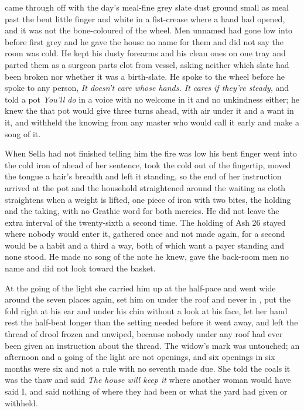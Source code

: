  came through  off  with the day's meal-fine grey slate dust ground small as meal past the bent little finger and white in a fist-crease where a hand had opened, and it was not the bone-coloured  of the wheel. Men unnamed had gone low into  before first grey and he gave the house no name for them and did not say the room was cold. He kept his dusty forearms and his clean ones on one tray and parted them as a surgeon parts clot from vessel, asking neither which slate had been broken nor whether it was a birth-slate. He spoke to the wheel before he spoke to any person, \emph{It doesn't care whose hands. It cares if they're steady}, and told a pot \emph{You'll do} in a voice with no welcome in it and no unkindness either; he knew the  that pot would give three turns ahead, with air under it and a want in it, and withheld the knowing from any  master who would call it early and make a song of it.

When Sella had not finished telling him the fire was low his bent finger went into the cold iron of  ahead of her sentence, took the cold out of the fingertip, moved the tongue a hair's breadth and left it standing, so the end of her instruction arrived at the pot and the household straightened around the waiting as cloth straightens when a weight is lifted, one piece of iron with two bites, the holding and the taking, with no Grathic word for both mercies. He did not leave the extra interval of the twenty-sixth a second time. The holding of Ash 26 stayed where nobody would enter it, gathered once and not made again, for a second would be a habit and a third a way, both of which want a payer standing and none stood. He made no song of the note he knew, gave the back-room men no name and did not look toward the basket.

\scenebreak

At the going of the light she carried him up at the half-pace and went wide around the seven places again, set him on  under the roof and never in , put the fold right at his ear and under his chin without a look at his face, let her hand rest the half-beat longer than the setting needed before it went away, and left the thread of drool frozen and unwiped, because nobody under any roof had ever been given an instruction about the thread. The widow's mark was untouched; an afternoon and a going of the light are not openings, and six openings in six months were six and not a rule with no seventh made due. She told the coals it was the thaw and said \emph{The house will keep it} where another woman would have said I, and said nothing of where they had been or what the yard had given or withheld.

